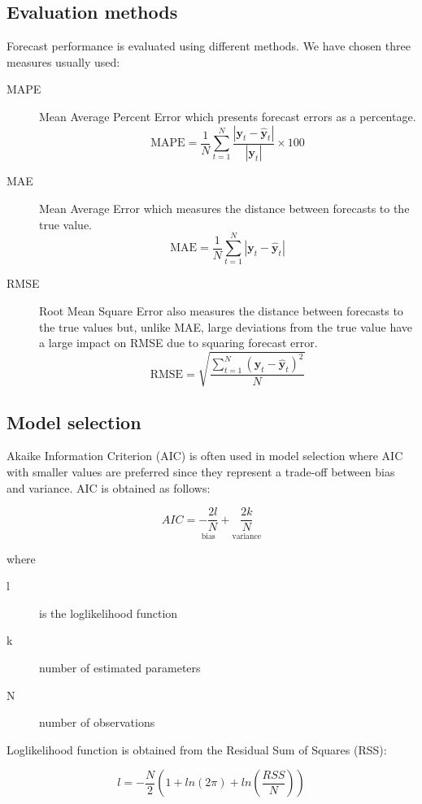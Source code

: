 \subsection{Evaluation methods} \label{sec:evaluation}

Forecast performance is evaluated using different methods. We have chosen three
measures usually used:
\begin{description}
\item[MAPE] Mean Average Percent Error which presents forecast errors as a
percentage.
\begin{equation}\label{eq:MAPE}
\text{MAPE} = \frac{1}{N} \sum_{t=1}^{N} 
\frac{\left|\mathbf{y}_t-\hat{\mathbf{y}}_t\right|}{\left|\mathbf{y}_t\right|}
 \times 100 
\end{equation}
\item[MAE] Mean Average Error which measures the distance between forecasts to the
true value.
\begin{equation}\label{eq:MAE}
\text{MAE} = \frac{1}{N} \sum_{t=1}^{N} 
\left| 
\mathbf{y}_t-\hat{\mathbf{y}}_t
\right| 
\end{equation}
\item[RMSE] Root Mean Square Error also measures the distance between forecasts
to the true values but, unlike MAE, large deviations from the true value have a
large impact on RMSE due to squaring forecast error.
\begin{equation}\label{eq:RMSE}
\text{RMSE} = \sqrt{
\frac{\displaystyle \sum_{t=1}^{N} (\mathbf{y}_t-\hat{\mathbf{y}}_t)^2}{N}}
\end{equation}
\end{description}


\subsection{Model selection} \label{sec:pselection}
Akaike Information Criterion (AIC) is often used in model selection where AIC
with smaller values are preferred since they represent a trade-off between bias
and variance.  AIC is obtained as follows:

\begin{equation}
\label{eq:aicformula}
AIC = \underset{\text{bias}}{-\frac{2l}{N}} + 
\underset{\text{variance}}{\frac{2k}{N}}
\end{equation}

\noindent where 

\begin{description}
\item[l] is the loglikelihood function
\item[k] number of estimated parameters
\item[N] number of observations
\end{description}

Loglikelihood function is obtained from the Residual Sum of Squares (RSS):

\begin{equation}
\label{eq:ll}
l = -\frac{N}{2} \left(1 + ln(2\pi) + ln\left(\frac{RSS}{N}\right)\right) 
\end{equation}

